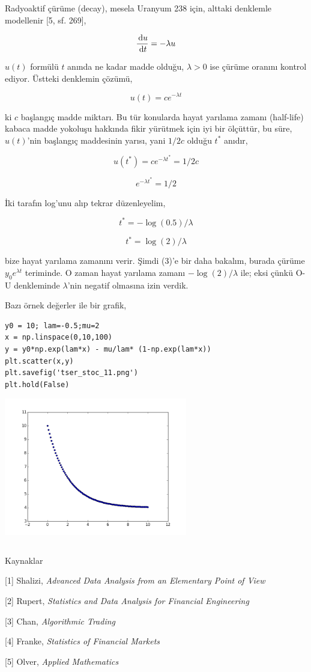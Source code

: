 \documentclass[12pt,fleqn]{article}\usepackage{../../common}
\begin{document}
Radyoaktif çürüme (decay), mesela Uranyum 238 için, alttaki denklemle
modellenir [5, sf. 269],

$$ \frac{\,\mathrm{d} u}{\,\mathrm{d} t} = - \lambda u$$

$u(t)$ formülü $t$ anında ne kadar madde olduğu, $\lambda > 0$ ise çürüme
oranını kontrol ediyor. Üstteki denklemin çözümü,

$$ u(t) = c e^{-\lambda t} $$

ki $c$ başlangıç madde miktarı. Bu tür konularda hayat yarılama zamanı
(half-life) kabaca madde yokoluşu hakkında fikir yürütmek için iyi bir ölçüttür,
bu süre, $u(t)$'nin başlangıç maddesinin yarısı, yani $1/2 c$ olduğu $t^*$
anıdır,


$$ u(t^*) = c e^{-\lambda t^*} = 1/2 c$$

$$  e^{-\lambda t^*} = 1/2 $$

İki tarafın log'unu alıp tekrar düzenleyelim,

$$ t^* = -\log(0.5)/\lambda $$

$$ t^* = \log(2)/\lambda $$

bize hayat yarılama zamanını verir. Şimdi (3)'e bir daha bakalım, burada çürüme
$y_0 e^{\lambda t}$ teriminde. O zaman hayat yarılama zamanı $-\log(2)/\lambda$
ile; eksi çünkü O-U denkleminde $\lambda$'nin negatif olmasına izin verdik.

Bazı örnek değerler ile bir grafik,

\begin{verbatim}
y0 = 10; lam=-0.5;mu=2
x = np.linspace(0,10,100)
y = y0*np.exp(lam*x) - mu/lam* (1-np.exp(lam*x))
plt.scatter(x,y)
plt.savefig('tser_stoc_11.png')
plt.hold(False)
\end{verbatim}

\includegraphics[height=6cm]{tser_stoc_11.png}

\inputminted[fontsize=\footnotesize]{python}{halflife.py}

Kaynaklar 

[1] Shalizi, {\em Advanced Data Analysis from an Elementary Point of View}

[2] Rupert, {\em Statistics and Data Analysis for Financial Engineering}

[3] Chan, {\em Algorithmic Trading}

[4] Franke, {\em Statistics of Financial Markets}

[5] Olver, {\em Applied Mathematics}
\end{document}
